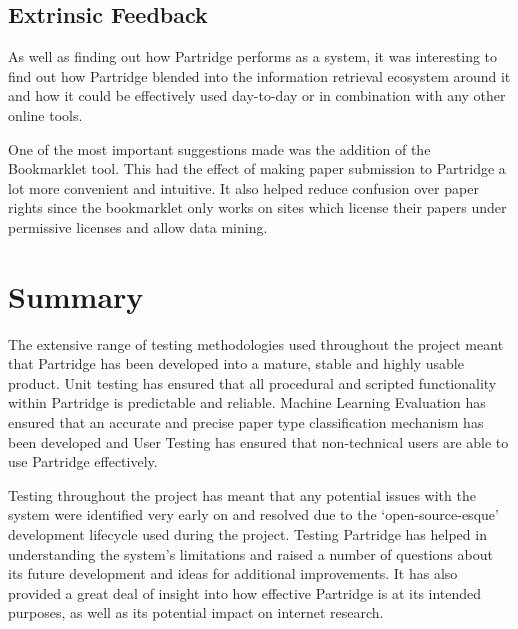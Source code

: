 \subsection{Extrinsic Feedback}

As well as finding out how Partridge performs as a system, it was interesting
to find out how Partridge blended into the information retrieval ecosystem around
it and how it could be effectively used day-to-day or in combination with any other
online tools.

One of the most important suggestions made was the addition of the Bookmarklet
tool. This had the effect of making paper submission to Partridge a lot more
convenient and intuitive. It also helped reduce confusion over paper
rights since the bookmarklet only works on sites which license
their papers under permissive licenses and allow data mining. 

\section{Summary}

The extensive range of testing methodologies used throughout the project meant
that Partridge has been developed into a mature, stable and highly usable
product. Unit testing has ensured that all procedural and scripted
functionality within Partridge is predictable and reliable. Machine Learning
Evaluation has ensured that an accurate and precise paper type classification
mechanism has been developed and User Testing has ensured that non-technical
users are able to use Partridge effectively.

Testing throughout the project has meant that any potential
issues with the system were identified very early on and resolved due to the
`open-source-esque' development lifecycle used during the project.  Testing
Partridge has helped in understanding the system's limitations and raised a
number of questions about its future development and ideas for additional
improvements. It has also provided a great deal of insight into how effective
Partridge is at its intended purposes, as well as its potential impact on
internet research.
